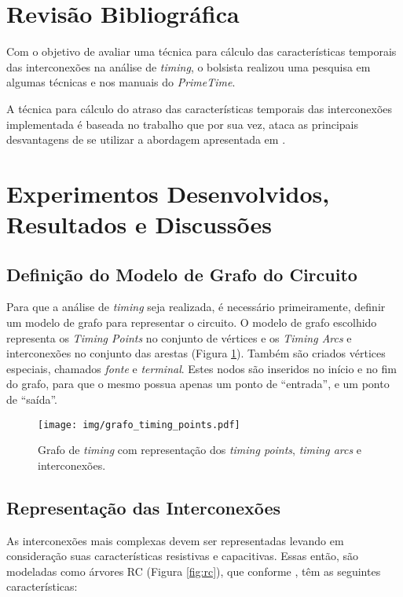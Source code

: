 \documentclass[
	12pt,				%
	openright,			%
	twoside,			%
	a4paper,			%
	english,			%
	french,				%
	spanish,			%
	brazil,				%
	]{abntex2}
\begin{document}
\section{Revisão Bibliográfica}

Com o objetivo de avaliar uma técnica para cálculo das características temporais das interconexões na análise de \textit{timing}, o bolsista realizou uma pesquisa em algumas técnicas e nos manuais do \textit{PrimeTime}. 

A técnica para cálculo do atraso das características temporais das interconexões implementada é baseada no trabalho \cite{PURI02} que por sua vez, ataca as principais desvantagens de se utilizar a abordagem apresentada em \cite{Kashyap00}.

\section{Experimentos Desenvolvidos, Resultados e Discussões}

\subsection{Definição do Modelo de Grafo do Circuito}
Para que a análise de \textit{timing} seja realizada, é necessário primeiramente, definir um modelo de grafo para representar o circuito. O modelo de grafo escolhido representa os \textit{Timing Points} no conjunto de vértices e os \textit{Timing Arcs} e interconexões no conjunto das arestas (Figura \ref{fig:grafo_timing_points}). Também são criados vértices especiais, chamados \textit{fonte} e \textit{terminal}. Estes nodos são inseridos no início e no fim do grafo, para que o mesmo possua apenas um ponto de ``entrada'', e um ponto de ``saída''.

\begin{figure}[ht]
\begin{center}
\texttt{[image: img/grafo\_timing\_points.pdf]} 
\caption{Grafo de \textit{timing} com representação dos \textit{timing points}, \textit{timing arcs} e interconexões.}
\label{fig:grafo_timing_points}
\end{center}
\end{figure}



\subsection{Representação das Interconexões}
As interconexões mais complexas devem ser representadas levando em consideração suas características resistivas e capacitivas. Essas então, são modeladas como árvores RC (Figura \ref{fig:rc}), que conforme , têm as seguintes características: 
\end{document}
